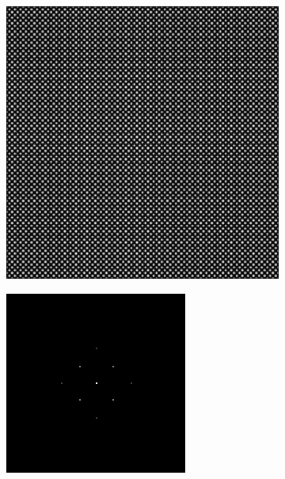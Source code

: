 \begin{figure}[h]
	\centering
	\begin{subfigure}{0.4\textwidth}
		\centering
		\includegraphics[width=1\linewidth, scale=0.5]{./images/isosense_visualisation_real.png}
		\caption{}
		\label{fig:isosense_visualisation_real}
	\end{subfigure}
	\begin{subfigure}{0.4\textwidth}
		\centering
		\includegraphics[width=1\linewidth, scale=0.5]{./images/isosense_visualisation_ft.png}

\end{subfigure}
\end{figure}
